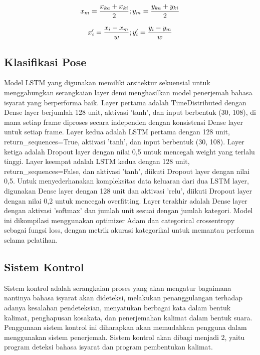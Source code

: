 \begin{equation}
  \label{eq:shoulderMidpointNorm}
  x_m = \frac{x_{ka} + x_{ki}}{2} ; \\
   y_m = \frac{y_{ka} + y_{ki}}{2}
\end{equation}

\begin{equation}
  \label{eq:normalization}
  x'_i = \frac{x_i - x_m}{w} ;  \\
   y'_i = \frac{y_i - y_m}{w}
\end{equation}

\subsection{Klasifikasi Pose}
\label{subsec:klasifikasipose}

Model LSTM yang digunakan memiliki arsitektur sekuensial untuk menggabungkan serangkaian layer demi menghasilkan model penerjemah bahasa isyarat yang berperforma baik. Layer pertama adalah TimeDistributed dengan Dense layer berjumlah 128 unit, aktivasi 'tanh', dan input berbentuk (30, 108), di mana setiap frame diproses secara independen dengan konsistensi Dense layer untuk setiap frame. Layer kedua adalah LSTM pertama dengan 128 unit, return\_sequences=True, aktivasi 'tanh', dan input berbentuk (30, 108). Layer ketiga adalah Dropout layer dengan nilai 0,5 untuk mencegah weight yang terlalu tinggi. Layer keempat adalah LSTM kedua dengan 128 unit, return\_sequences=False, dan aktivasi 'tanh', diikuti Dropout layer dengan nilai 0,5. Untuk menyederhanakan kompleksitas data keluaran dari dua LSTM layer, digunakan Dense layer dengan 128 unit dan aktivasi 'relu', diikuti Dropout layer dengan nilai 0,2 untuk mencegah overfitting. Layer terakhir adalah Dense layer dengan aktivasi 'softmax' dan jumlah unit sesuai dengan jumlah kategori. Model ini dikompilasi menggunakan optimizer Adam dan categorical crossentropy sebagai fungsi loss, dengan metrik akurasi kategorikal untuk memantau performa selama pelatihan.

\subsection{Sistem Kontrol}
\label{subsec:sisitemkontrol}
Sistem kontrol adalah serangkaian proses yang akan mengatur bagaimana nantinya bahasa isyarat akan dideteksi, melakukan penanggulangan terhadap adanya kesalahan pendeteksian, menyatukan berbagai kata dalam bentuk kalimat, penghapusan kosakata, dan penerjemahan kalimat dalam bentuk suara. Penggunaan sistem kontrol ini diharapkan akan memudahkan pengguna dalam menggunakan sistem penerjemah. Sistem kontrol akan dibagi menjadi 2, yaitu program deteksi bahasa isyarat dan program pembentukan kalimat.

